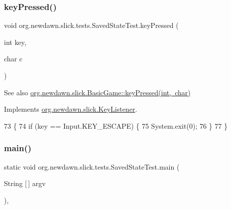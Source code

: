 \subsubsection{\texorpdfstring{key\+Pressed()}{keyPressed()}}
{\footnotesize\ttfamily void org.\+newdawn.\+slick.\+tests.\+Saved\+State\+Test.\+key\+Pressed (\begin{DoxyParamCaption}\item[{int}]{key,  }\item[{char}]{c }\end{DoxyParamCaption})\hspace{0.3cm}{\ttfamily [inline]}}

\begin{DoxySeeAlso}{See also}
\mbox{\hyperlink{classorg_1_1newdawn_1_1slick_1_1_basic_game_a4fbb3345b5abf5ddd54a99466d07f02f}{org.\+newdawn.\+slick.\+Basic\+Game\+::key\+Pressed(int, char)}} 
\end{DoxySeeAlso}


Implements \mbox{\hyperlink{interfaceorg_1_1newdawn_1_1slick_1_1_key_listener_ac0b0568a21ef486c4f51382614c196ef}{org.\+newdawn.\+slick.\+Key\+Listener}}.


\begin{DoxyCode}
73                                             \{
74         \textcolor{keywordflow}{if} (key == Input.KEY\_ESCAPE) \{
75             System.exit(0);
76         \}
77     \}
\end{DoxyCode}
\mbox{\label{classorg_1_1newdawn_1_1slick_1_1tests_1_1_saved_state_test_aecb09abf8d907edee1f78c0db6d66f8f}} 
\subsubsection{\texorpdfstring{main()}{main()}}
{\footnotesize\ttfamily static void org.\+newdawn.\+slick.\+tests.\+Saved\+State\+Test.\+main (\begin{DoxyParamCaption}\item[{String \mbox{[}$\,$\mbox{]}}]{argv }\end{DoxyParamCaption})\hspace{0.3cm}{\ttfamily [inline]}, {\ttfamily [static]}}

